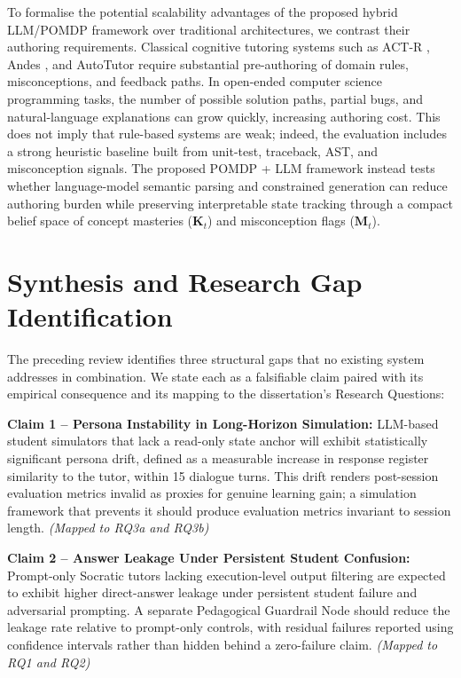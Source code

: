 \documentclass[11pt,a4paper]{report}
\begin{document}
To formalise the potential scalability advantages of the proposed hybrid LLM/POMDP framework over traditional architectures, we contrast their authoring requirements. Classical cognitive tutoring systems such as ACT-R \cite{anderson1995cognitive}, Andes \cite{vanlehn2005andes}, and AutoTutor \cite{graesser2005autotutor} require substantial pre-authoring of domain rules, misconceptions, and feedback paths. In open-ended computer science programming tasks, the number of possible solution paths, partial bugs, and natural-language explanations can grow quickly, increasing authoring cost. This does not imply that rule-based systems are weak; indeed, the evaluation includes a strong heuristic baseline built from unit-test, traceback, AST, and misconception signals. The proposed POMDP + LLM framework instead tests whether language-model semantic parsing and constrained generation can reduce authoring burden while preserving interpretable state tracking through a compact belief space of concept masteries ($\mathbf{K}_t$) and misconception flags ($\mathbf{M}_t$).

\section{Synthesis and Research Gap Identification}
The preceding review identifies three structural gaps that no existing system addresses in combination. We state each as a falsifiable claim paired with its empirical consequence and its mapping to the dissertation's Research Questions:

\noindent\textbf{Claim 1 -- Persona Instability in Long-Horizon Simulation:} LLM-based student simulators that lack a read-only state anchor will exhibit statistically significant persona drift, defined as a measurable increase in response register similarity to the tutor, within 15 dialogue turns. This drift renders post-session evaluation metrics invalid as proxies for genuine learning gain; a simulation framework that prevents it should produce evaluation metrics invariant to session length. \textit{(Mapped to RQ3a and RQ3b)}

\noindent\textbf{Claim 2 -- Answer Leakage Under Persistent Student Confusion:} Prompt-only Socratic tutors lacking execution-level output filtering are expected to exhibit higher direct-answer leakage under persistent student failure and adversarial prompting. A separate Pedagogical Guardrail Node should reduce the leakage rate relative to prompt-only controls, with residual failures reported using confidence intervals rather than hidden behind a zero-failure claim. \textit{(Mapped to RQ1 and RQ2)}
\end{document}

